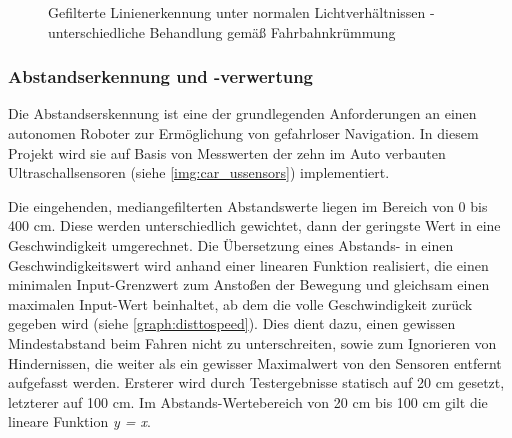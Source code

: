 \documentclass[12pt, a4paper]{scrartcl}
\begin{document}
\begin{figure}
	\caption{Gefilterte Linienerkennung unter normalen Lichtverhältnissen - unterschiedliche Behandlung gemäß Fahrbahnkrümmung}
	\label{img:line_filt_normal_u_kurve}
\end{figure}


\clearpage

\subsubsection{Abstandserkennung und -verwertung}
Die Abstandserskennung ist eine der grundlegenden Anforderungen an einen autonomen Roboter zur Ermöglichung von gefahrloser Navigation. In diesem Projekt wird sie auf Basis von Messwerten der zehn im Auto verbauten Ultraschallsensoren (siehe \autoref{img:car_ussensors})  implementiert.

Die eingehenden, mediangefilterten Abstandswerte liegen im Bereich von 0 bis 400 cm. Diese werden unterschiedlich gewichtet, dann der geringste Wert in eine Geschwindigkeit umgerechnet. Die Übersetzung eines Abstands- in einen Geschwindigkeitswert wird anhand einer linearen Funktion realisiert, die einen minimalen  Input-Grenzwert zum Anstoßen der Bewegung und gleichsam einen maximalen Input-Wert beinhaltet, ab dem die volle Geschwindigkeit zurück gegeben wird (siehe \autoref{graph:disttospeed}). Dies dient dazu, einen gewissen Mindestabstand beim Fahren nicht zu unterschreiten, sowie zum Ignorieren von Hindernissen, die weiter als ein gewisser Maximalwert von den Sensoren entfernt aufgefasst werden. Ersterer wird durch Testergebnisse statisch auf 20 cm gesetzt, letzterer auf 100 cm. Im Abstands-Wertebereich von 20 cm bis 100 cm gilt die lineare Funktion \emph{y = x}.
\end{document}
